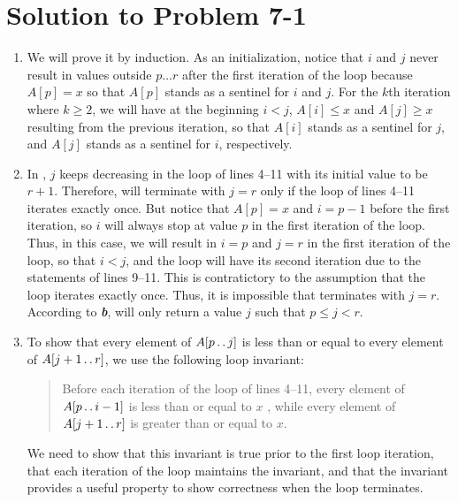 \documentclass[a4paper, fleqn]{article}
\begin{document}
\section*{Solution to Problem 7-1}
\begin{enumerate}
\renewcommand{\labelenumi}{\itshape \bfseries \alph{enumi}.}


\item  %
We will prove it by induction. As an initialization, notice that $i$ and $j$ 
never result in values outside $p \ldots r$ after the first iteration of the 
 loop because $A[p] = x$ so that $A[p]$ stands as a sentinel for $i$ 
and $j$. For the $k$th iteration where $k \geq 2$, we will have at the beginning 
$i < j$, $A[i] \leq x$ and $A[j] \geq x$ resulting from the previous iteration, 
so that $A[i]$ stands as a sentinel for $j$, and $A[j]$ stands as a sentinel for 
$i$, respectively.




\item  %
In , $j$ keeps decreasing in the  loop of lines 
4--11 with its initial value to be $r + 1$. Therefore,  
will terminate with $j = r$ only if the  loop of lines 4--11 iterates 
exactly once. But notice that $A[p] = x$ and $i = p - 1$ before the first 
iteration, so $i$ will always stop at value $p$ in the first iteration of the 
 loop. Thus, in this case, we will result in $i = p$ and $j = r$ in 
the first iteration of the  loop, so that $i < j$, and the  
loop will have its second iteration due to the  statements of lines 
9--11. This is contratictory to the assumption that the  loop iterates 
exactly once. Thus, it is impossible that  terminates with 
$j = r$. According to \textit{\textbf{b}},  will only 
return a value $j$ such that $p \leq j < r$.




\item  %
To show that every element of $A[p \mathinner{\ldotp\ldotp} j]$ is less than or equal to every 
element of $A[j+1 \mathinner{\ldotp\ldotp} r]$, we use the following loop invariant:
\begin{quote}
Before each iteration of the  loop of lines 4--11, every element of 
$A[p \mathinner{\ldotp\ldotp} i-1]$ is less than or equal to $x$ , while every element of 
$A[j+1 \mathinner{\ldotp\ldotp} r]$ is greater than or equal to $x$.
\end{quote}
We need to show that this invariant is true prior to the first loop iteration, 
that each iteration of the loop maintains the invariant, and that the invariant 
provides a useful property to show correctness when the loop terminates.
\begin{description}


\end{description}
\end{enumerate}
\end{document}

